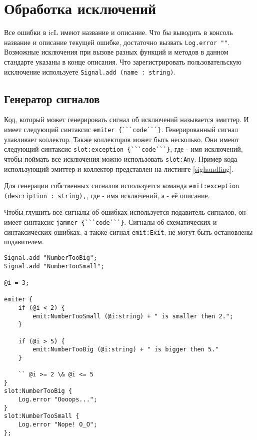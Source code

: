 \section{Обработка исключений}

Все ошибки в icL имеют название и описание. Что бы выводить в консоль название и описание текущей ошибке, достаточно вызвать \lstinline|Log.error ""|. Возможные исключения при вызове разных функций и методов в данном стандарте указаны в конце описания. Что зарегистрировать пользовательскую исключение используете \lstinline|Signal.add (name : string)|.

\subsection{Генератор сигналов}

Код, который может генерировать сигнал об исключений называется эмиттер. И имеет следующий синтаксис \lstinline|emiter {```code```}|. Генерированный сигнал улавливает коллектор. Также коллекторов может быть несколько. Они имеют следующий синтаксис \lstinline|slot:exception {```code```}|,
где  - имя исключений, чтобы поймать все исключения можно использовать \lstinline|slot:Any|. Пример кода использующий эмиттер и коллектор представлен на листинге \ref{sighandling}.

Для генерации собственных сигналов используется команда \lstinline|emit:exception (description : string),|, где  - имя исключений, а  - её описание.

Чтобы глушить все сигналы об ошибках используется подавитель сигналов, он имеет синтаксис \lstinline|jammer {```code```}|. Сигналы об схематических и синтаксических ошибках, а также сигнал \lstinline|emit:Exit|, не могут быть остановлены подавителем.

\begin{lstlisting}[caption=Обработка инключении, label=sighandling]
Signal.add "NumberTooBig";
Signal.add "NumberTooSmall";

@i = 3;

emiter {
	if (@i < 2) {
		emit:NumberTooSmall (@i:string) + " is smaller then 2.";
	}
	
	if (@i > 5) {
		emit:NumberTooBig (@i:string) + " is bigger then 5."
	}

	`` @i >= 2 \& @i <= 5
}
slot:NumberTooBig {
	Log.error "Oooops...";
}
slot:NumberTooSmall {
	Log.error "Nope! O_O";
};
\end{lstlisting}

